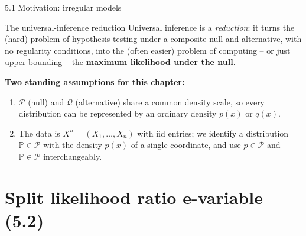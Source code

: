 \documentclass[aspectratio=169,10pt]{beamer}
\renewcommand{\P}{\mathbb{P}}
\newcommand{\calP}{\mathcal{P}}
\newcommand{\calQ}{\mathcal{Q}}
\begin{document}
\begin{frame}[allowframebreaks]{5.1 Motivation: irregular models}
  \begin{block}{The universal-inference reduction}
    Universal inference is a \emph{reduction}: it turns the (hard)
    problem of hypothesis testing under a composite null and
    alternative, with no regularity conditions, into the (often easier)
    problem of computing -- or just upper bounding -- the
    \textbf{maximum likelihood under the null}.
  \end{block}

  \textbf{Two standing assumptions for this chapter:}
  \begin{enumerate}
    \item $\calP$ (null) and $\calQ$ (alternative) share a common
      density scale, so every distribution can be represented by an
      ordinary density $p(x)$ or $q(x)$.
    \item The data is $X^n = (X_1,\ldots,X_n)$ with iid entries; we
      identify a distribution $\P \in \calP$ with the density $p(x)$ of
      a single coordinate, and use $p \in \calP$ and $\P \in \calP$
      interchangeably.
  \end{enumerate}

\end{frame}

\section{Split likelihood ratio e-variable (5.2)}
\end{document}

